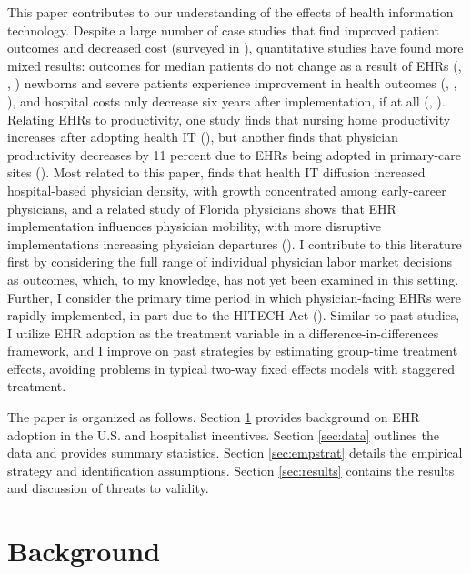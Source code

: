 \documentclass[12pt]{article}
\begin{document}
This paper contributes to our understanding of the effects of health information technology. Despite a large number of case studies that find improved patient outcomes and decreased cost (surveyed in \cite{Buntin2011TheResults}), quantitative studies have found more mixed results: outcomes for median patients do not change as a result of EHRs (\cite{Agha2014TheCare}, \cite{McCullough2016HealthCoordination}, \cite{Meyerhoefer}) newborns and severe patients experience improvement in health outcomes (\cite{Miller2009}, \cite{Freedman2015}, \cite{McCullough2016HealthCoordination}), and hospital costs only decrease six years after implementation, if at all (\cite{Agha2014TheCare}, \cite{dranove2014trillion}). Relating EHRs to productivity, one study finds that nursing home productivity increases after adopting health IT (\cite{Hitt2016}), but another finds that physician productivity decreases by 11 percent due to EHRs being adopted in primary-care sites (\cite{Meyerhoefer}). Most related to this paper, \citet{lin2026health} finds that health IT diffusion increased hospital-based physician density, with growth concentrated among early-career physicians, and a related study of Florida physicians shows that EHR implementation influences physician mobility, with more disruptive implementations increasing physician departures (\cite{greenwood2019does}). I contribute to this literature first by considering the full range of individual physician labor market decisions as outcomes, which, to my knowledge, has not yet been examined in this setting. Further, I consider the primary time period in which physician-facing EHRs were rapidly implemented, in part due to the HITECH Act (\cite{dranove2015investment}). Similar to past studies, I utilize EHR adoption as the treatment variable in a difference-in-differences framework, and I improve on past strategies by estimating group-time treatment effects, avoiding problems in typical two-way fixed effects models with staggered treatment.

The paper is organized as follows. Section \ref{sec:background} provides background on EHR adoption in the U.S. and hospitalist incentives. Section \ref{sec:data} outlines the data and provides summary statistics. Section \ref{sec:empstrat} details the empirical strategy and identification assumptions. Section \ref{sec:results} contains the results and discussion of threats to validity. 




\section{Background}\label{sec:background}
\end{document}
